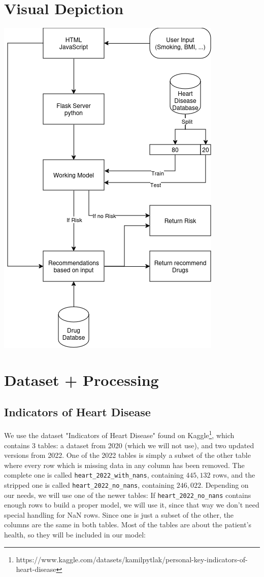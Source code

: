 \documentclass{article}
\begin{document}
   


\section{Visual Depiction}
\begin{center} 
\includegraphics[scale=.75]{Hearth_death.drawio(1).png}
\end{center}

\section{Dataset + Processing}

\subsection{Indicators of Heart Disease}
We use the dataset "Indicators of Heart Disease" found on Kaggle\footnote{https://www.kaggle.com/datasets/kamilpytlak/personal-key-indicators-of-heart-disease},
which contains 3 tables: a dataset from 2020 (which we will not use),
and two updated versions from 2022.
One of the 2022 tables is simply a subset of the other table where every row which is missing data in any column has been removed.
The complete one is called \texttt{heart\_2022\_with\_nans}, containing $445,132$ rows,
and the stripped one is called \texttt{heart\_2022\_no\_nans}, containing $246,022$.
Depending on our needs, we will use one of the newer tables:
If \texttt{heart\_2022\_no\_nans} contains enough rows to build a proper model,
we will use it, since that way we don't need special handling for NaN rows.
Since one is just a subset of the other, the columns are the same in both tables.
Most of the tables are about the patient's health, so they will be included in our model:
\end{document}
